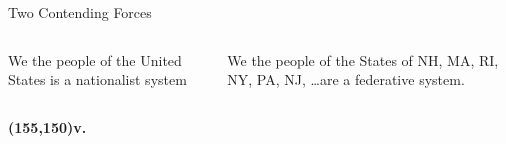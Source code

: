\begin{frame}{Two Contending Forces}
    \begin{columns}[onlytextwidth]
            \begin{varblock}[0.9\textwidth]{}\huge{We the people of the United States is a nationalist system}\end{varblock}

            \begin{varblock}[0.9\textwidth]{}\huge{We the people of the States of NH, MA, RI, NY, PA, NJ, \ldots  are a federative system.}\end{varblock}
    \end{columns}
    \textbf{\huge{ \color{red}
        \Put(155,150){v.}
    }}
\end{frame}


